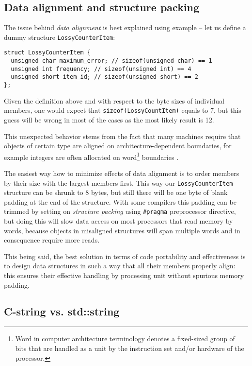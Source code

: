 \subsection{Data alignment and structure packing}

The issue behind \emph{data alignment} is best explained using example
-- let us define a dummy structure \verb|LossyCounterItem|:

\begin{verbatim}
struct LossyCounterItem {
  unsigned char maximum_error; // sizeof(unsigned char) == 1
  unsigned int frequency; // sizeof(unsigned int) == 4
  unsigned short item_id; // sizeof(unsigned short) == 2
};
\end{verbatim}

Given the definition above and with respect to the byte sizes of individual members,
one would expect that \verb|sizeof(LossyCountItem)| equals to 7, but this guess
will be wrong in most of the cases as the most likely result is 12.

This unexpected behavior stems from the fact that many machines require that
objects of certain type are aligned on architecture-dependent boundaries,
for example integers are often allocated on word\footnote{Word in computer
architecture terminology denotes a fixed-sized group of bits that are handled
as a unit by the instruction  set and/or hardware of the processor.} boundaries
\citep[Chapter 5]{stroustrup:cplusplus}.

The easiest way how to minimize effects of data alignment is to order members
by their size with the largest members first.
This way our \verb|LossyCounterItem| structure can be shrunk to 8 bytes,
but still there will be one byte of blank padding at the end of the structure.
With some compilers this padding can be trimmed by setting on \emph{structure packing}
using \verb|#pragma| preprocessor directive, but doing this will slow data access
on most processors that read memory by words, because objects in misaligned structures
will span multiple words and in consequence require more reads.

This being said, the best solution in terms of code portability and effectiveness
is to design data structures in such a way that all their members properly align:
this ensures their effective handling by processing unit without spurious memory padding.

\subsection{C-string vs. std::string}


